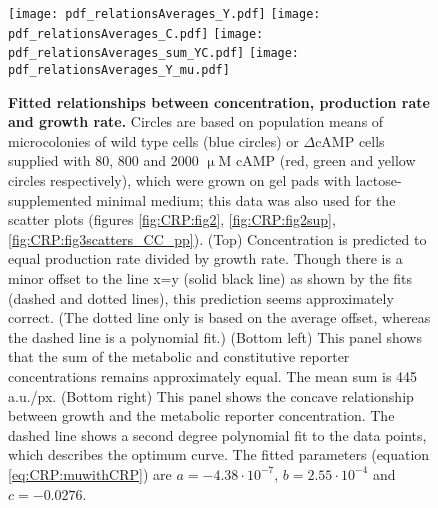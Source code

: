 \begin{figure}%
	\centering
	\texttt{[image: pdf\_relationsAverages\_Y.pdf]}
	\texttt{[image: pdf\_relationsAverages\_C.pdf]}
	\texttt{[image: pdf\_relationsAverages\_sum\_YC.pdf]}
	\texttt{[image: pdf\_relationsAverages\_Y\_mu.pdf]}		
	\caption{ 
		\textbf{Fitted relationships between concentration, production rate and growth rate.}
		Circles 
        are based on population means of microcolonies of 
        wild type cells (blue circles) or $\Delta$cAMP cells supplied with 80, 800 and 2000 $\upmu$M cAMP (red, green and yellow circles respectively),
        which were grown on gel pads with lactose-supplemented minimal medium; 
        this data was also used for the scatter plots (figures \ref{fig:CRP:fig2}, \ref{fig:CRP:fig2sup}, \ref{fig:CRP:fig3scatters_CC_pp}).
		(Top) Concentration is predicted to equal production rate divided by growth rate. Though there is a minor offset to the line x=y (solid black line) as shown by the fits (dashed and dotted lines), this prediction seems approximately correct. (The dotted line only is based on the average offset, whereas the dashed line is a polynomial fit.)
		(Bottom left) This panel shows that the sum of the metabolic and constitutive reporter concentrations remains approximately equal. The mean sum is 445 a.u./px.
		(Bottom right) This panel shows the concave relationship between growth and the metabolic reporter concentration. The dashed line shows a second degree polynomial fit to the data points, which describes the optimum curve. The fitted parameters (equation \ref{eq:CRP:muwithCRP}) are $a=-4.38\cdot10^{-7}$, $b=2.55\cdot10^{-4}$ and $c=-0.0276$.
	}
	\label{fig:CRP:averagerelations1}
\end{figure}%

